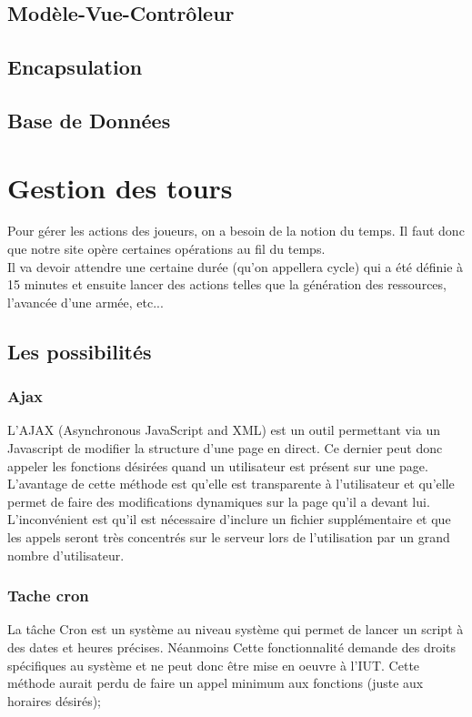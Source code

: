 \documentclass[11pt,a4paper]{article}
\begin{document}
\subsection{Modèle-Vue-Contrôleur}
\subsection{Encapsulation}
\subsection{Base de Données}

\newpage\section{Gestion des tours}
Pour gérer les actions des joueurs, on a besoin de la notion du temps. Il faut donc que notre site opère certaines opérations au fil du temps. \\
Il va devoir attendre une certaine durée (qu'on appellera cycle) qui a été définie à 15 minutes et ensuite lancer des actions telles que la génération des ressources, l'avancée d'une armée, etc...\\
\subsection{Les possibilités}
\subsubsection{Ajax}
L'AJAX (Asynchronous JavaScript and XML) est un outil permettant via un Javascript de modifier la structure d'une page en direct. 
Ce dernier peut donc appeler les fonctions désirées quand un utilisateur est présent sur une page.\\
L'avantage de cette méthode est qu'elle est transparente à l'utilisateur et qu'elle permet de faire des modifications dynamiques sur la page qu'il a devant lui. \\
L'inconvénient est qu'il est nécessaire d'inclure un fichier supplémentaire et que les appels seront très concentrés sur le serveur lors de l'utilisation par un grand nombre d'utilisateur.\\
\subsubsection{Tache cron}
La tâche Cron est un système au niveau système qui permet de lancer un script à des dates et heures précises. Néanmoins Cette fonctionnalité demande des droits spécifiques au système et ne peut donc être mise en oeuvre à l'IUT. Cette méthode aurait perdu de faire un appel minimum aux fonctions (juste aux horaires désirés);
\end{document}
